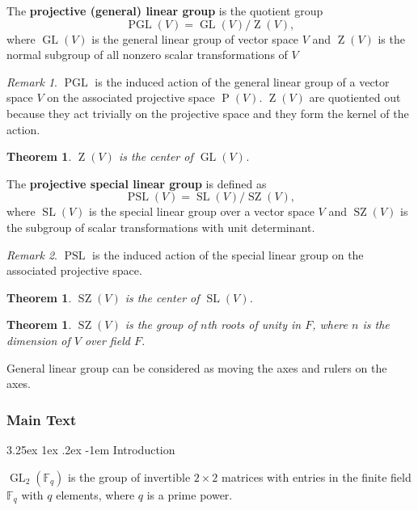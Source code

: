 \documentclass[12pt, letterpaper]{article}
\makeatletter
\newcommand{\GL}{\operatorname{GL}}
\newcommand{\SL}{\operatorname{SL}}
\newcommand{\PGL}{\operatorname{PGL}}
\newcommand{\PSL}{\operatorname{PSL}}
\newcommand{\ZZ}{\operatorname{Z}}
\newcommand{\SZ}{\operatorname{SZ}}
\newtheorem{thm}[prop]{Theorem}
\renewcommand\paragraph{\@startsection{paragraph}{4}{\z@}%
	{3.25ex \@plus1ex \@minus.2ex}%
	{-1em}%
	{\normalfont\normalsize\bfseries}}
\theoremstyle{definition}
\theoremstyle{remark}
\newtheorem*{rem*}{Remark}
\theoremstyle{definition}
\theoremstyle{plain}
\numberwithin{equation}{section}
\makeatother
\begin{document}
	\begin{def*}
		The \textbf{projective (general) linear group} is the quotient group
		\[\PGL(V) = \GL(V)/\ZZ(V),\]
		where $\GL(V)$ is the general linear group of vector space $V$
		and $\ZZ(V)$ is the normal subgroup of all nonzero scalar transformations of $V$
	\end{def*}
	\begin{rem*}
		$\PGL$ is the induced action of the general linear group of a vector space $V$ on the associated projective space $\operatorname{P}(V)$. $\ZZ(V)$ are quotiented out because they act trivially on the projective space and they form the kernel of the action.
	\end{rem*}



	\begin{thm}
		$\ZZ(V)$ is the center of $\GL(V)$.
	\end{thm}


	\begin{def*}
		The \textbf{projective special linear group} is defined as
		\[\PSL(V) = \SL(V)/\SZ(V),\]
		where $\SL(V)$ is the special linear group over a vector space $V$
		and $\SZ(V)$ is the subgroup of scalar transformations with unit determinant.
	\end{def*}
	\begin{rem*}
		$\PSL$ is the induced action of the special linear group on the associated projective space.
	\end{rem*}

	\begin{thm}
		$\SZ(V)$ is the center of $\SL(V)$.
	\end{thm}
	\begin{thm}
		$\SZ(V)$ is the group of $n$th roots of unity in $F$,
		where $n$ is the dimension of $V$ over field $F$.
	\end{thm}

	General linear group can be considered as moving the axes and rulers on the axes.
	
	

	\subsubsection{Main Text}
	
	\paragraph{Introduction}
	\begin{def*}[GL2Fq]
		$\GL_2(\mathbb{F}_q)$ is the group of invertible $2 \times 2$ matrices with entries in the finite field 
		$\mathbb{F}_q$ with $q$ elements, where $q$ is a prime power.
	\end{def*}
\end{document}
